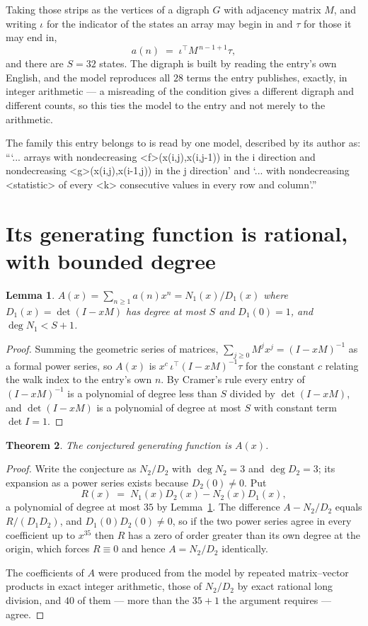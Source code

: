 \documentclass[11pt,a4paper]{article}
\theoremstyle{plain}
\newtheorem{theorem}{Theorem}
\newtheorem{lemma}[theorem]{Lemma}
\theoremstyle{definition}
\begin{document}
Taking those strips as the vertices of a digraph $G$ with adjacency matrix $M$, and writing
$\iota$ for the indicator of the states an array may begin in and $\tau$ for those it may end
in,
\[
a(n)\;=\;\iota^{\!\top}M^{\,n-1+1}\tau ,
\]
and there are $S=32$ states. The digraph is built by reading the entry's own English, and the
model reproduces all $28$ terms the entry publishes, exactly, in integer arithmetic --- a
misreading of the condition gives a different digraph and different counts, so this ties the
model to the entry and not merely to the arithmetic.

The family this entry belongs to is read by one model, described by its author as: ```... arrays with nondecreasing <f>(x(i,j),x(i,j-1)) in the i direction and nondecreasing <g>(x(i,j),x(i-1,j)) in the j direction' and `... with nondecreasing <statistic> of every <k> consecutive values in every row and column'.''


\section{Its generating function is rational, with bounded degree}

\begin{lemma}\label{lem:rat}
$A(x)=\sum_{n\ge1}a(n)x^n=N_1(x)/D_1(x)$ where $D_1(x)=\det(I-xM)$ has degree at most
$S$ and $D_1(0)=1$, and $\deg N_1<S+1$.
\end{lemma}

\begin{proof}
Summing the geometric series of matrices, $\sum_{j\ge0}M^jx^j=(I-xM)^{-1}$ as a formal
power series, so $A(x)$ is $x^{c}\,\iota^{\!\top}(I-xM)^{-1}\tau$ for the constant $c$
relating the walk index to the entry's own $n$. By Cramer's rule every entry of
$(I-xM)^{-1}$ is a polynomial of degree less than $S$ divided by $\det(I-xM)$, and
$\det(I-xM)$ is a polynomial of degree at most $S$ with constant term $\det I=1$.
\end{proof}

\begin{theorem}
The conjectured generating function is $A(x)$.
\end{theorem}

\begin{proof}
Write the conjecture as $N_2/D_2$ with $\deg N_2=3$ and $\deg D_2=3$; its expansion as a
power series exists because $D_2(0)\neq0$. Put
\[
R(x)\;=\;N_1(x)D_2(x)-N_2(x)D_1(x),
\]
a polynomial of degree at most $35$ by Lemma~\ref{lem:rat}. The difference
$A-N_2/D_2$ equals $R/(D_1D_2)$, and $D_1(0)D_2(0)\neq0$, so if the two power series agree in
every coefficient up to $x^{35}$ then $R$ has a zero of order greater than its own
degree at the origin, which forces $R\equiv0$ and hence $A=N_2/D_2$ identically.

The coefficients of $A$ were produced from the model by repeated matrix--vector products in
exact integer arithmetic, those of $N_2/D_2$ by exact rational long division, and $40$
of them --- more than the $35+1$ the argument requires --- agree.
\end{proof}
\end{document}
